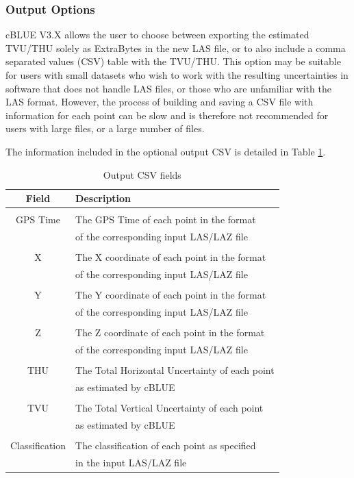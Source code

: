 \documentclass[11pt, a4paper]{article}
\begin{document}
\subsubsection{Output Options}
cBLUE V3.X allows the user to choose between exporting the estimated TVU/THU solely as ExtraBytes in the new LAS file, or to also include a comma separated values (CSV) table with the TVU/THU. This option may be suitable for users with small datasets who wish to work with the resulting uncertainties in software that does not handle LAS files, or those who are unfamiliar with the LAS format. However, the process of building and saving a CSV file with information for each point can be slow and is therefore not recommended for users with large files, or a large number of files. 

\vspace{1em}

The information included in the optional output CSV is detailed in Table \ref{tab:csv}. 
\begin{table}[H]
    \centering
    \begin{tabular}{c|l}
        \textbf{Field} & \textbf{Description} \\
        \hline \\
        GPS Time & The GPS Time of each point in the format \\
        \ & of the corresponding input LAS/LAZ file \\
        \hline \\
        X &  The X coordinate of each point in the format \\
        \ & of the corresponding input LAS/LAZ file\\
        \hline \\
        Y & The Y coordinate of each point in the format \\
        \ & of the corresponding input LAS/LAZ file \\
        \hline \\
        Z & The Z coordinate of each point in the format \\
        \ & of the corresponding input LAS/LAZ file \\
        \hline \\
        THU & The Total Horizontal Uncertainty of each point \\
        \ & as estimated by cBLUE \\
        \hline \\
        TVU & The Total Vertical Uncertainty of each point \\
        \ & as estimated by cBLUE \\
        \hline \\
        Classification & The classification of each point as specified \\
        \ & in the input LAS/LAZ file \\
        \hline
    \end{tabular}
    \caption{Output CSV fields}
    \label{tab:csv}
\end{table}
\end{document}
